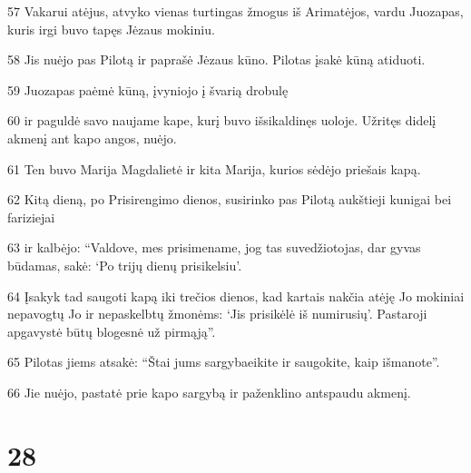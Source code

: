 \par 57 Vakarui atėjus, atvyko vienas turtingas žmogus iš Arimatėjos, vardu Juozapas, kuris irgi buvo tapęs Jėzaus mokiniu. 
\par 58 Jis nuėjo pas Pilotą ir paprašė Jėzaus kūno. Pilotas įsakė kūną atiduoti. 
\par 59 Juozapas paėmė kūną, įvyniojo į švarią drobulę 
\par 60 ir paguldė savo naujame kape, kurį buvo išsikaldinęs uoloje. Užritęs didelį akmenį ant kapo angos, nuėjo. 
\par 61 Ten buvo Marija Magdalietė ir kita Marija, kurios sėdėjo priešais kapą. 
\par 62 Kitą dieną, po Prisirengimo dienos, susirinko pas Pilotą aukštieji kunigai bei fariziejai 
\par 63 ir kalbėjo: “Valdove, mes prisimename, jog tas suvedžiotojas, dar gyvas būdamas, sakė: ‘Po trijų dienų prisikelsiu’. 
\par 64 Įsakyk tad saugoti kapą iki trečios dienos, kad kartais nakčia atėję Jo mokiniai nepavogtų Jo ir nepaskelbtų žmonėms: ‘Jis prisikėlė iš numirusių’. Pastaroji apgavystė būtų blogesnė už pirmąją”. 
\par 65 Pilotas jiems atsakė: “Štai jums sargyba­eikite ir saugokite, kaip išmanote”. 
\par 66 Jie nuėjo, pastatė prie kapo sargybą ir paženklino antspaudu akmenį.



\chapter{28}


